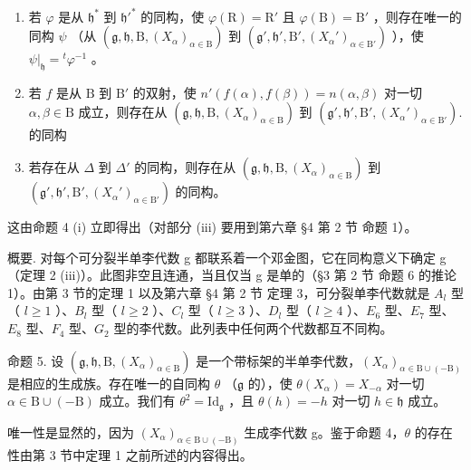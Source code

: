 \begin{enumerate}
\def\labelenumi{(\roman{enumi})}
\item
  若 \(\varphi\) 是从 \(\mathfrak{h}^*\) 到 \(\mathfrak{h}'^*\) 的同构，使 \(\varphi(\mathrm{R}) = \mathrm{R}'\) 且 \(\varphi(\mathrm{B}) = \mathrm{B}'\) ，则存在唯一的同构 \(\psi\) （从 \((\mathfrak{g}, \mathfrak{h}, \mathrm{B}, (X_{\alpha})_{\alpha \in \mathrm{B}})\) 到 \((\mathfrak{g}', \mathfrak{h}', \mathrm{B}', (X_{\alpha}')_{\alpha \in \mathrm{B}'})\) ），使 \(\psi|_{\mathfrak{h}} = {}^t\varphi^{-1}\) 。
\item
  若 \(f\) 是从 \(\mathrm{B}\) 到 \(\mathrm{B}'\) 的双射，使 \(n'(f(\alpha), f(\beta)) = n(\alpha, \beta)\) 对一切 \(\alpha, \beta \in \mathrm{B}\) 成立，则存在从 \((\mathfrak{g}, \mathfrak{h}, \mathrm{B}, (X_{\alpha})_{\alpha \in \mathrm{B}})\) 到 \((\mathfrak{g}', \mathfrak{h}', \mathrm{B}', (X_{\alpha}')_{\alpha \in \mathrm{B}'}).\) 的同构
\item
  若存在从 \(\Delta\) 到 \(\Delta'\) 的同构，则存在从 \((\mathfrak{g},\mathfrak{h},\mathrm{B},(X_{\alpha})_{\alpha \in \mathrm{B}})\) 到 \((\mathfrak{g}',\mathfrak{h}',\mathrm{B}',(X_{\alpha}')_{\alpha \in \mathrm{B}'})\) 的同构。
\end{enumerate}

这由命题 4 (i) 立即得出（对部分 (iii) 要用到第六章 §4 第 2 节 命题 1）。

概要. 对每个可分裂半单李代数 g 都联系着一个邓金图，它在同构意义下确定 g （定理 2 (iii)）。此图非空且连通，当且仅当 g 是单的（§3 第 2 节 命题 6 的推论 1）。由第 3 节的定理 1 以及第六章 §4 第 2 节 定理 3，可分裂单李代数就是 \(A_{l}\) 型（ \(l \geq 1\) ）、\(B_{l}\) 型（ \(l \geq 2\) ）、\(C_{l}\) 型（ \(l \geq 3\) ）、\(D_{l}\) 型（ \(l \geq 4\) ）、\(E_{6}\) 型、\(E_{7}\) 型、\(E_{8}\) 型、\(F_{4}\) 型、\(G_{2}\) 型的李代数。此列表中任何两个代数都互不同构。

命题 5. 设 \((\mathfrak{g},\mathfrak{h},\mathrm{B},(X_{\alpha})_{\alpha \in \mathrm{B}})\) 是一个带标架的半单李代数，\((X_{\alpha})_{\alpha \in \mathrm{B}\cup (-\mathrm{B})}\) 是相应的生成族。存在唯一的自同构 \(\theta\) （\(\mathfrak{g}\) 的），使 \(\theta (X_{\alpha}) = X_{-\alpha}\) 对一切 \(\alpha \in \mathrm{B}\cup (-\mathrm{B})\) 成立。我们有 \(\theta^2 = \mathrm{Id}_{\mathfrak{g}}\) ，且 \(\theta (h) = -h\) 对一切 \(h\in \mathfrak{h}\) 成立。

唯一性是显然的，因为 \((X_{\alpha})_{\alpha\in\mathrm{B}\cup(-\mathrm{B})}\) 生成李代数 g。鉴于命题 4，\(\theta\) 的存在性由第 3 节中定理 1 之前所述的内容得出。

